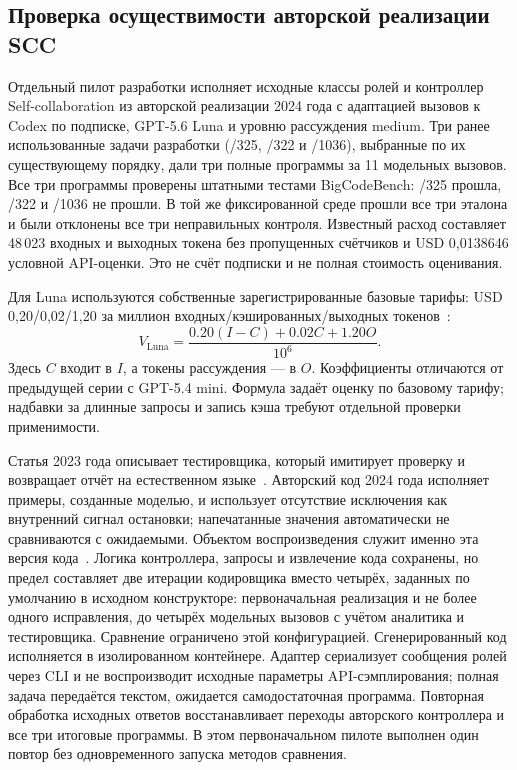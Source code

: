 \subsection{Проверка осуществимости авторской реализации SCC}
\label{sec:scc-feasibility}
Отдельный пилот разработки исполняет исходные классы ролей и контроллер Self-collaboration из авторской реализации 2024 года с адаптацией вызовов к Codex по подписке, GPT-5.6 Luna и уровню рассуждения medium. Три ранее использованные задачи разработки (/325, /322 и /1036), выбранные по их существующему порядку, дали три полные программы за 11 модельных вызовов. Все три программы проверены штатными тестами BigCodeBench: /325 прошла, /322 и /1036 не прошли. В той же фиксированной среде прошли все три эталона и были отклонены все три неправильных контроля. Известный расход составляет 48\,023 входных и выходных токена без пропущенных счётчиков и USD 0{,}0138646 условной API-оценки. Это не счёт подписки и не полная стоимость оценивания.

Для Luna используются собственные зарегистрированные базовые тарифы: USD 0{,}20/0{,}02/1{,}20 за миллион входных/кэшированных/выходных токенов~\cite{openai56luna2026}:
\[
V_{\mathrm{Luna}}=\frac{0.20(I-C)+0.02C+1.20O}{10^6}.
\]
Здесь $C$ входит в $I$, а токены рассуждения --- в $O$. Коэффициенты отличаются от предыдущей серии с GPT-5.4 mini. Формула задаёт оценку по базовому тарифу; надбавки за длинные запросы и запись кэша требуют отдельной проверки применимости.

Статья 2023 года описывает тестировщика, который имитирует проверку и возвращает отчёт на естественном языке~\cite{dong2023selfcollaboration}. Авторский код 2024 года исполняет примеры, созданные моделью, и использует отсутствие исключения как внутренний сигнал остановки; напечатанные значения автоматически не сравниваются с ожидаемыми. Объектом воспроизведения служит именно эта версия кода~\cite{scc2024source}. Логика контроллера, запросы и извлечение кода сохранены, но предел составляет две итерации кодировщика вместо четырёх, заданных по умолчанию в исходном конструкторе: первоначальная реализация и не более одного исправления, до четырёх модельных вызовов с учётом аналитика и тестировщика. Сравнение ограничено этой конфигурацией. Сгенерированный код исполняется в изолированном контейнере. Адаптер сериализует сообщения ролей через CLI и не воспроизводит исходные параметры API-сэмплирования; полная задача передаётся текстом, ожидается самодостаточная программа. Повторная обработка исходных ответов восстанавливает переходы авторского контроллера и все три итоговые программы. В этом первоначальном пилоте выполнен один повтор без одновременного запуска методов сравнения.

